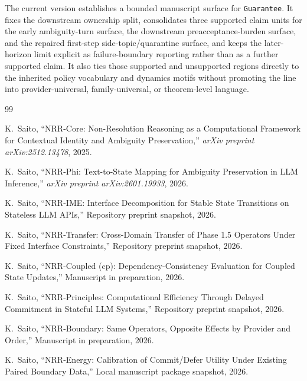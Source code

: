 \documentclass[11pt]{article}
\begin{document}
The current version establishes a bounded manuscript surface for
\texttt{Guarantee}. It fixes the downstream ownership split, consolidates three
supported claim units for the early ambiguity-turn surface, the downstream
preacceptance-burden surface, and the repaired first-step side-topic/quarantine
surface, and keeps the later-horizon limit explicit as failure-boundary
reporting rather than as a further supported claim. It also ties those
supported and unsupported regions directly to the inherited policy vocabulary
and dynamics motifs without promoting the line into provider-universal,
family-universal, or theorem-level language.

\begin{thebibliography}{99}
\raggedright

K.~Saito,
\newblock ``NRR-Core: Non-Resolution Reasoning as a Computational Framework for Contextual Identity and Ambiguity Preservation,''
\newblock \emph{arXiv preprint arXiv:2512.13478}, 2025.

K.~Saito,
\newblock ``NRR-Phi: Text-to-State Mapping for Ambiguity Preservation in LLM Inference,''
\newblock \emph{arXiv preprint arXiv:2601.19933}, 2026.

K.~Saito,
\newblock ``NRR-IME: Interface Decomposition for Stable State Transitions on Stateless LLM APIs,''
\newblock Repository preprint snapshot, 2026.

K.~Saito,
\newblock ``NRR-Transfer: Cross-Domain Transfer of Phase 1.5 Operators Under Fixed Interface Constraints,''
\newblock Repository preprint snapshot, 2026.

K.~Saito,
\newblock ``NRR-Coupled (cp): Dependency-Consistency Evaluation for Coupled State Updates,''
\newblock Manuscript in preparation, 2026.

K.~Saito,
\newblock ``NRR-Principles: Computational Efficiency Through Delayed Commitment in Stateful LLM Systems,''
\newblock Repository preprint snapshot, 2026.

K.~Saito,
\newblock ``NRR-Boundary: Same Operators, Opposite Effects by Provider and Order,''
\newblock Manuscript in preparation, 2026.

K.~Saito,
\newblock ``NRR-Energy: Calibration of Commit/Defer Utility Under Existing Paired Boundary Data,''
\newblock Local manuscript package snapshot, 2026.

\end{thebibliography}
\end{document}
